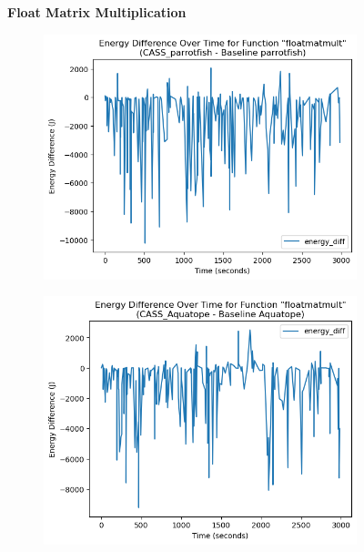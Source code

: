 \documentclass[times, 10pt,twocolumn]{article}
\begin{document}
 \begin{figure}[ht]
   \centering
   \textbf{Float Matrix Multiplication}\par\medskip
   \begin{subfigure}[b]{0.4\textwidth}
      \includegraphics[width=\textwidth]{imgs/final_experiment_plots/energy_comparison/parrotfish/floatmatmult.png}
     \caption{}
     \label{fig:matmult_energy_diff_parrotfish}
   \end{subfigure}
   \hfill
   \begin{subfigure}[b]{0.4\textwidth}
      \includegraphics[width=\textwidth]{imgs/final_experiment_plots/energy_comparison/aquatope/floatmatmult.png}
     \caption{}
     \label{fig:matmult_energy_diff_aquatope}
   \end{subfigure}
   

\end{figure}
\end{document}
